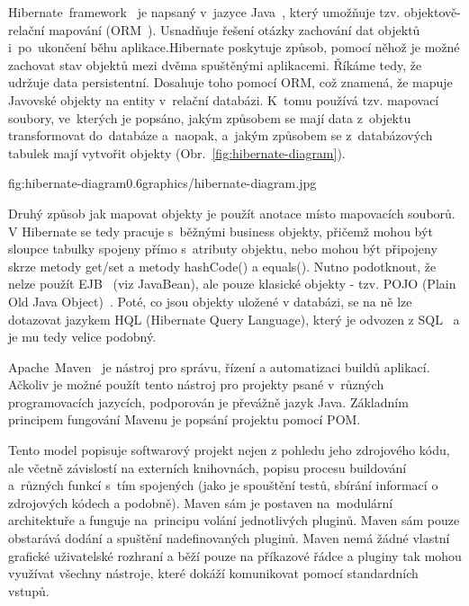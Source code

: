 Hibernate~framework~\cite{hibernate-framework} je napsaný v~jazyce Java~\cite{java}, který umožňuje tzv. objektově-relační mapování (ORM~\cite{orm}). Usnadňuje řešení otázky zachování dat objektů i~po~ukončení běhu aplikace.Hibernate poskytuje způsob, pomocí něhož je možné zachovat stav objektů mezi dvěma spuštěnými aplikacemi. Říkáme tedy, že udržuje data persistentní. Dosahuje toho pomocí ORM, což znamená, že mapuje Javovské objekty na entity v~relační databázi. K~tomu používá tzv. mapovací soubory, ve~kterých je popsáno, jakým způsobem se mají data z~objektu transformovat do~databáze a~naopak, a~jakým způsobem se z~databázových tabulek mají vytvořit objekty (Obr.~\ref{fig:hibernate-diagram}).

 {fig:hibernate-diagram}{0.6}{graphics/hibernate-diagram.jpg}

Druhý způsob jak mapovat objekty je použít anotace místo mapovacích souborů. V Hibernate se tedy pracuje s~běžnými business objekty, přičemž mohou být sloupce tabulky spojeny přímo s~atributy objektu, nebo mohou být připojeny skrze metody get/set a metody hashCode() a equals(). Nutno podotknout, že nelze použít EJB~\cite{enterprise-javabeans} (viz JavaBean), ale pouze klasické objekty - tzv. POJO (Plain Old Java Object)~\cite{pojo}. Poté, co jsou objekty uložené v databázi, se na ně lze dotazovat jazykem HQL (Hibernate Query Language), který je odvozen z SQL~\cite{sql} a je mu tedy velice podobný.

Apache~Maven~\cite{apache-maven} je nástroj pro správu, řízení a automatizaci buildů aplikací. Ačkoliv je možné použít tento nástroj pro projekty psané v~různých programovacích jazycích, podporován je převážně jazyk Java. Základním principem fungování Mavenu je popsání projektu pomocí POM. 


Tento model popisuje softwarový projekt nejen z pohledu jeho zdrojového kódu, ale včetně závislostí na externích knihovnách, popisu procesu buildování a~různých funkcí s~tím spojených (jako je spouštění testů, sbírání informací o zdrojových kódech a podobně). Maven sám je postaven na~modulární architektuře a funguje na~principu volání jednotlivých pluginů. Maven sám pouze obstarává dodání a spuštění nadefinovaných pluginů. Maven nemá žádné vlastní grafické uživatelské rozhraní a běží pouze na příkazové řádce a pluginy tak mohou využívat všechny nástroje, které dokáží komunikovat pomocí standardních vstupů. 

